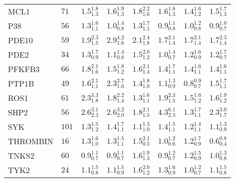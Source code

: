 \begin{tabular}{llllllll}
MCL1        &    $71$ &  $1.5_{1.3}^{1.8}$ &  $1.6_{1.3}^{1.9}$ &  $1.8_{1.6}^{2.2}$ &  $1.6_{1.3}^{1.8}$ &  $1.4_{1.2}^{1.6}$ &  $1.5_{1.3}^{1.7}$ \\
P38         &    $56$ &  $1.3_{1.1}^{1.6}$ &  $1.0_{0.8}^{1.4}$ &  $1.3_{1.1}^{1.7}$ &  $0.9_{0.8}^{1.1}$ &  $1.0_{0.8}^{1.2}$ &  $0.9_{0.7}^{1.0}$ \\
PDE10       &    $59$ &  $1.9_{1.5}^{2.3}$ &  $2.9_{1.6}^{4.2}$ &  $2.1_{1.8}^{2.4}$ &  $1.7_{1.4}^{2.1}$ &  $1.7_{1.4}^{2.1}$ &  $1.7_{1.4}^{2.3}$ \\
PDE2        &    $34$ &  $1.3_{0.9}^{1.7}$ &  $1.1_{0.8}^{1.4}$ &  $1.5_{1.2}^{2.0}$ &  $1.0_{0.7}^{1.4}$ &  $1.2_{0.9}^{1.6}$ &  $1.2_{0.7}^{1.7}$ \\
PFKFB3      &    $66$ &  $1.8_{1.6}^{2.1}$ &  $1.5_{1.2}^{1.8}$ &  $1.6_{1.4}^{2.1}$ &  $1.4_{1.1}^{1.7}$ &  $1.4_{1.1}^{1.6}$ &  $1.4_{1.1}^{1.6}$ \\
PTP1B       &    $49$ &  $1.6_{1.1}^{2.1}$ &  $2.3_{1.6}^{2.7}$ &  $1.4_{1.0}^{1.8}$ &  $1.1_{0.9}^{1.3}$ &  $0.8_{0.7}^{0.9}$ &  $1.5_{1.1}^{1.7}$ \\
ROS1        &    $61$ &  $2.3_{1.8}^{3.3}$ &  $1.8_{1.4}^{2.2}$ &  $1.3_{1.1}^{1.6}$ &  $1.9_{1.5}^{2.3}$ &  $1.5_{1.2}^{1.6}$ &  $1.6_{1.2}^{1.9}$ \\
SHP2        &    $56$ &  $2.6_{2.3}^{3.1}$ &  $2.6_{2.0}^{3.2}$ &  $1.8_{1.5}^{2.1}$ &  $4.3_{2.3}^{6.1}$ &  $1.3_{1.1}^{1.7}$ &  $2.3_{1.7}^{3.0}$ \\
SYK         &   $101$ &  $1.3_{1.2}^{1.5}$ &  $1.4_{1.1}^{1.7}$ &  $1.1_{1.0}^{1.3}$ &  $1.4_{1.1}^{1.5}$ &  $1.2_{1.1}^{1.4}$ &  $1.1_{0.9}^{1.3}$ \\
THROMBIN    &    $16$ &  $1.3_{1.0}^{1.6}$ &  $1.3_{1.1}^{1.5}$ &  $1.5_{0.5}^{2.1}$ &  $1.0_{0.6}^{1.2}$ &  $1.2_{0.9}^{1.7}$ &  $0.6_{0.4}^{0.8}$ \\
TNKS2       &    $60$ &  $0.9_{0.7}^{1.1}$ &  $0.9_{0.7}^{1.1}$ &  $1.6_{1.3}^{1.9}$ &  $0.9_{0.7}^{1.2}$ &  $1.2_{0.9}^{1.5}$ &  $1.0_{0.8}^{1.3}$ \\
TYK2        &    $24$ &  $1.1_{0.8}^{1.5}$ &  $1.1_{0.9}^{1.5}$ &  $1.6_{1.2}^{2.0}$ &  $1.3_{0.9}^{1.6}$ &  $1.0_{0.7}^{1.2}$ &  $1.1_{0.8}^{1.5}$ \\
\bottomrule
\end{tabular}
